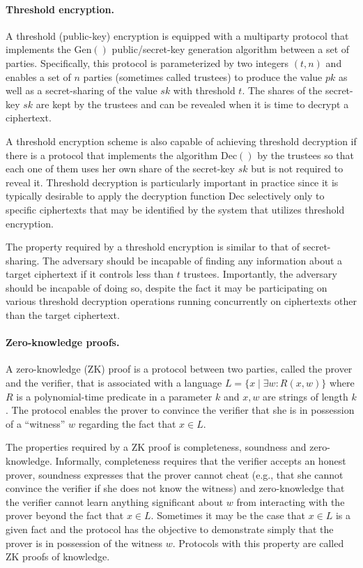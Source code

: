 \paragraph{Threshold encryption.} A threshold (public-key) encryption
is equipped with a multiparty protocol that implements the
$\mathrm{Gen}()$ public/secret-key generation algorithm between a set
of parties. Specifically, this protocol is parameterized by two
integers $(t,n)$ and enables a set of $n$ parties (sometimes called
trustees) to produce the value $pk$ as well as a secret-sharing of the
value $sk$ with threshold $t$. The shares of the secret-key $sk$ are
kept by the trustees and can be revealed when it is time to decrypt a
ciphertext.

A threshold encryption scheme is also capable of achieving threshold
decryption if there is a protocol that implements the algorithm
$\mathrm{Dec}()$ by the trustees so that each one of them uses her own
share of the secret-key $sk$ but is not required to reveal it.
Threshold decryption is particularly important in practice since it is
typically desirable to apply the decryption function $\mathrm{Dec}$
selectively only to specific ciphertexts that may be identified by the
system that utilizes threshold encryption.

The property required by a threshold encryption is similar to that of
secret-sharing.  The adversary should be incapable of finding any
information about a target ciphertext if it controls less than $t$
trustees. Importantly, the adversary should be incapable of doing so,
despite the fact it may be participating on various threshold
decryption operations running concurrently on ciphertexts other than
the target ciphertext.

\paragraph{Zero-knowledge proofs.} A zero-knowledge (ZK) proof is a
protocol between two parties, called the prover and the verifier, that
is associated with a language $L = \{x \mid \exists w : R(x,w)\}$
where $R$ is a polynomial-time predicate in a parameter $k$ and $x,w$
are strings of length $k$.  The protocol enables the prover to
convince the verifier that she is in possession of a ``witness'' $w$
regarding the fact that $x\in L$.

The properties required by a ZK proof is completeness, soundness and
zero-knowledge.  Informally, completeness requires that the verifier
accepts an honest prover, soundness expresses that the prover cannot
cheat (e.g., that she cannot convince the verifier if she does not
know the witness) and zero-knowledge that the verifier cannot learn
anything significant about $w$ from interacting with the prover beyond
the fact that $x\in L$. Sometimes it may be the case that $x\in L$ is
a given fact and the protocol has the objective to demonstrate simply
that the prover is in possession of the witness $w$.  Protocols with
this property are called ZK proofs of knowledge.

